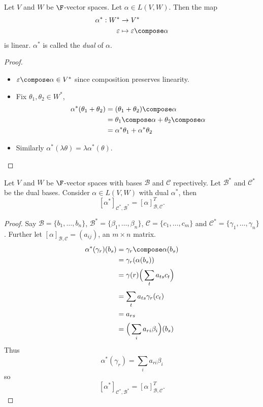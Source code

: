 \documentclass[a4paper]{article}
\newcommand*{\basis}{\mathcal}
\theoremstyle{definition}
\begin{document}
\begin{lemma}
  Let \(V\) and \(W\) be \(\F\)-vector spaces. Let \(\alpha \in L(V,W)\). Then the map
  \begin{align*}
    \alpha^*: W^* &\to V^* \\
    \varepsilon &\mapsto \varepsilon \compose \alpha
  \end{align*}
  is linear. \(\alpha^*\) is called the \emph{dual} of \(\alpha\).
\end{lemma}

\begin{proof}\leavevmode
  \begin{itemize}
  \item \(\varepsilon \compose \alpha \in V^*\) since composition preserves linearity.
  \item Fix \(\theta_1,\theta_2\in W^*\),
    \begin{align*}
      \alpha^*(\theta_1+\theta_2) &= (\theta_1+\theta_2)\compose \alpha \\
                                  &= \theta_1\compose \alpha + \theta_2 \compose \alpha \\
      &= \alpha^*\theta_1 + \alpha^*\theta_2
    \end{align*}
  \item Similarly \(\alpha^*(\lambda\theta) = \lambda\alpha^*(\theta)\).
  \end{itemize}
\end{proof}

\begin{proposition}
  Let \(V\) and \(W\) be \(\F\)-vector spaces with bases \(\basis B\) and \(\basis C\) repectively. Let \(\basis B^*\) and \(\basis C^*\) be the dual bases. Consider \(\alpha\in L(V,W)\) with dual \(\alpha^*\), then
  \[
    [\alpha^*]_{\basis C^*,\basis B^*} = [\alpha]^T_{\basis B,\basis C}.
  \]
\end{proposition}

\begin{proof}
  Say \(\basis B = \{b_1,\dots,b_n\}\), \(\basis B^* = \{\beta_1,\dots,\beta_n\}\), \(\basis C = \{c_1,\dots,c_m\}\) and \(\basis C^* = \{\gamma_1,\dots,\gamma_n\}\). Further let \([\alpha]_{\basis B,\basis C} = (a_{ij})\), an \(m\times n\) matrix.
  \begin{align*}
    \alpha^*(\gamma_r)(b_s) &= \gamma_r \compose \alpha(b_s) \\
                            &= \gamma_r(\alpha(b_s)) \\
                            &= \gamma(r) \Big( \sum_{t}^{ }a_{ts}c_t \Big) \\
                            &= \sum_{t}^{ } a_{ts} \gamma_r(c_t) \\
                            &= a_{rs} \\
                            &= \Big( \sum_{i}^{ } a_{ri}\beta_i \Big) (b_s)
  \end{align*}
  Thus
  \[
    \alpha^*(\gamma_r) = \sum_{i}^{ } a_{ri}\beta_i
  \]
  so
  \[
    [\alpha^*]_{\basis C^*,\basis B^*} = [\alpha]^T_{\basis B,\basis C}.
  \]
\end{proof}
\end{document}
